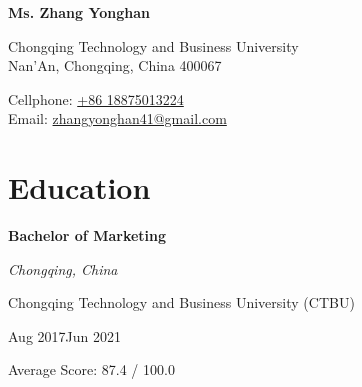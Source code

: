 \documentclass[a4paper,20pt]{article}
\begin{document}

\begin{center}
	\textbf{{\LARGE \color{black} Ms. Zhang Yonghan}}
\end{center}

	\begin{minipage}{.45\linewidth} 
		\begin{flushleft} 
    Chongqing Technology and Business University \\
    Nan'An, Chongqing, China  400067 
    		\end{flushleft} 
    	\end{minipage}
    \hfill 
    \begin{minipage}{.50\linewidth}
    		\begin{flushright}
    Cellphone: \href{} {+86 18875013224} \\
    Email: \href{} {zhangyonghan41@gmail.com} \\
    		\end{flushright}
    	\end{minipage}



\section{Education}

\begin{minipage}{.75\linewidth} \begin{flushleft}
\textbf{Bachelor of Marketing}
\end{flushleft} \end{minipage}
    \hfill 
    \begin{minipage}{.20\linewidth}\begin{flushright}
    	 \textit{Chongqing, China}
    	\end{flushright}\end{minipage}
    	\begin{minipage}{.75\linewidth} \begin{flushleft}
    Chongqing Technology and Business University (CTBU) \\
    	\end{flushleft} \end{minipage}
     \hfill
        \begin{minipage}{.20\linewidth}\begin{flushright}
        	 Aug 2017\textemdash Jun 2021
        	\end{flushright}\end{minipage}
        \begin{minipage}{.75\linewidth} \begin{flushleft}
    	    Average Score: 87.4 / 100.0 \\
    	\end{flushleft} 
     \end{minipage}
\end{document}
